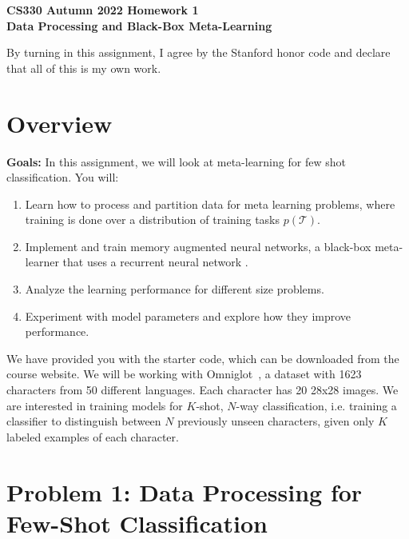 \documentclass[12pt]{article}
\begin{document}
\begin{center}
{\Large \textbf{CS330 Autumn 2022 Homework 1 \\ Data Processing and Black-Box Meta-Learning}}
\end{center}

By turning in this assignment, I agree by the Stanford honor code and declare
that all of this is my own work.

\section*{Overview}

\textbf{Goals:} In this assignment, we will look at meta-learning for few shot classification. You will:
\begin{enumerate}
    \item Learn how to process and partition data for meta learning problems, where training is done over a distribution of training tasks $p(\mathcal{T})$.
    \item Implement and train memory augmented neural networks, a black-box meta-learner that uses a recurrent neural network \cite{pmlr-v48-santoro16}.
    \item Analyze the learning performance for different size problems.
    \item Experiment with model parameters and explore how they improve performance.
\end{enumerate}

We have provided you with the starter code, which can be downloaded from the course website. We will be working with Omniglot~\cite{Lake1332}, a dataset with 1623 characters from 50 different languages. Each character has 20 28x28 images.
We are interested in training models for $K$-shot, $N$-way classification, i.e. training a classifier to distinguish between $N$ previously unseen characters, given only $K$ labeled examples of each character.

\vspace{0.2cm}


\section*{Problem 1: Data Processing for Few-Shot Classification}
\end{document}
